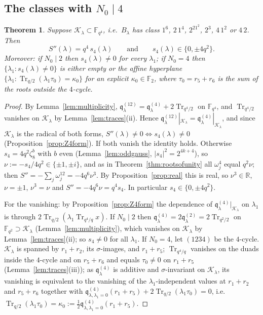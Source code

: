 \documentclass[12pt,a4paper]{amsart}
\newtheorem{theorem}{Theorem}[section]
\theoremstyle{definition}
\newcommand{\F}{\mathbb{F}}
\newcommand{\Tr}{\operatorname{Tr}}
\newcommand{\Kk}{\mathcal{K}}
\newcommand{\qq}{\mathfrak{q}}
\newcommand{\Spp}{S''}
\begin{document}
\subsection{The classes with \texorpdfstring{$N_0\mid4$}{N0 | 4}}
\begin{theorem}\label{thm:N0div4}
Suppose $\Kk_\lambda\subset\F_{q^4}$, i.e.\ $B_\lambda$ has class $1^6$, $2\,1^4$, $2^21^2$, $2^3$, $4\,1^2$ or $4\,2$. Then
\[
\Spp(\lambda)=q^4\,s_4(\lambda)\qquad\text{and}\qquad s_4(\lambda)\in\{0,\pm4q^2\} .
\]
Moreover: if $N_0\mid2$ then $s_4(\lambda)\ne0$ for every $\lambda_1$; if $N_0=4$ then $\{\lambda_1:s_4(\lambda)\ne0\}$ is either empty or the affine hyperplane $\{\lambda_1:\Tr_{q/2}(\lambda_1\tau_0)=\kappa_0\}$ for an explicit $\kappa_0\in\F_2$, where $\tau_0=r_5+r_6$ is the sum of the roots outside the $4$-cycle.
\end{theorem}
\begin{proof}
By Lemma~\ref{lem:multiplicity}, $\qq^{(12)}_\lambda=\qq^{(4)}_\lambda+2\Tr_{q^4/2}$ on $\F_{q^4}$, and $\Tr_{q^4/2}$ vanishes on $\Kk_\lambda$ by Lemma~\ref{lem:traces}(ii). Hence $\qq^{(12)}_\lambda|_{\Kk_\lambda}=\qq^{(4)}_\lambda|_{\Kk_\lambda}$, and since $\Kk_\lambda$ is the radical of both forms, $\Spp(\lambda)\ne0\iff s_4(\lambda)\ne0$ (Proposition~\ref{prop:Z4form}). If both vanish the identity holds. Otherwise $s_4=4q^2\zeta_8^b$ with $b$ even (Lemma~\ref{lem:oddgauss}, $|s_4|^2=2^{4k+4}$), so $\nu:=-s_4/4q^2\in\{\pm1,\pm i\}$, and as in Theorem~\ref{thm:rootsofunity} all $\omega_j^4$ equal $q^2\nu$; then $\Spp=-\sum_j\omega_j^{12}=-4q^6\nu^3$. By Proposition~\ref{prop:real} this is real, so $\nu^3\in\mathbb R$, $\nu=\pm1$, $\nu^3=\nu$ and $\Spp=-4q^6\nu=q^4s_4$. In particular $s_4\in\{0,\pm4q^2\}$.

For the vanishing: by Proposition~\ref{prop:Z4form} the dependence of $\qq^{(4)}_\lambda|_{\Kk_\lambda}$ on $\lambda_1$ is through $2\Tr_{q/2}(\lambda_1\Tr_{q^4/q}x)$. If $N_0\mid2$ then $\qq^{(4)}_\lambda=2\qq^{(2)}_\lambda=2\Tr_{q^2/2}$ on $\F_{q^2}\supset\Kk_\lambda$ (Lemma~\ref{lem:multiplicity}), which vanishes on $\Kk_\lambda$ by Lemma~\ref{lem:traces}(ii); so $s_4\ne0$ for all $\lambda_1$. If $N_0=4$, let $(1234)$ be the $4$-cycle. $\Kk_\lambda$ is spanned by $r_1+r_2$, its $\sigma$-images, and $r_1+r_5$; $\Tr_{q^4/q}$ vanishes on the duads inside the $4$-cycle and on $r_5+r_6$ and equals $\tau_0\ne0$ on $r_1+r_5$ (Lemma~\ref{lem:traces}(iii)); as $\qq^{(4)}_\lambda$ is additive and $\sigma$-invariant on $\Kk_\lambda$, its vanishing is equivalent to the vanishing of the $\lambda_1$-independent values at $r_1+r_2$ and $r_5+r_6$ together with $\qq^{(4)}_{\lambda,\lambda_1=0}(r_1+r_5)+2\Tr_{q/2}(\lambda_1\tau_0)=0$, i.e.\ $\Tr_{q/2}(\lambda_1\tau_0)=\kappa_0:=\frac12\qq^{(4)}_{\lambda,\lambda_1=0}(r_1+r_5)$.
\end{proof}
\end{document}
